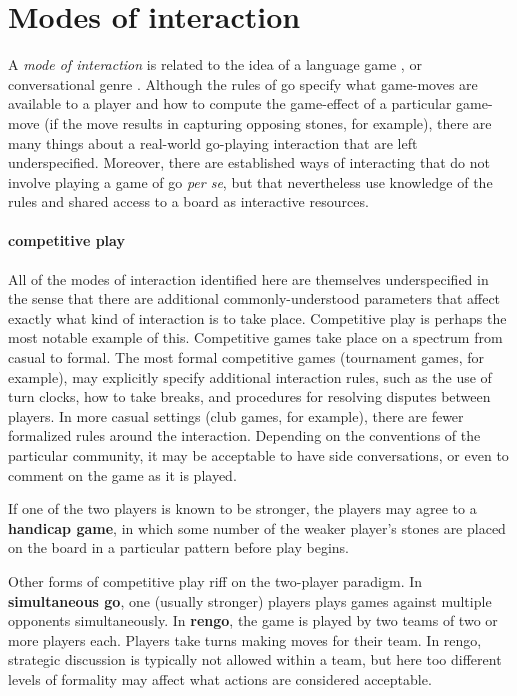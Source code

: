 \documentclass{scrartcl}
\begin{document}
\section{Modes of interaction}\label{sec:modes}

A \emph{mode of interaction} is related to the idea of a
language game \citep{wittgensteinPhilosophischeUntersuchungenPhilosophical2009}, or
conversational genre \citep{bakhtinSpeechGenresOther1987}.
Although the rules of go specify what game-moves are available to a player
and how to compute the game-effect of a particular game-move
(if the move results in capturing opposing stones, for example),
there are many things about a real-world go-playing interaction that are left
underspecified.
Moreover, there are established ways of interacting
that do not involve playing a game of go \textit{per se},
but that nevertheless 
use knowledge of the rules and shared access to a board
as interactive resources.

\paragraph{competitive play} All of the modes of interaction 
identified here are themselves underspecified in the sense that there 
are additional commonly-understood parameters that affect exactly what kind
of interaction is to take place.
Competitive play is perhaps the most notable example of this.
Competitive games take place on a spectrum from casual to formal.
The most formal competitive games (tournament games, for example),
may explicitly specify additional interaction rules,
such as the use of turn clocks, 
how to take breaks, and
procedures for resolving disputes between players.
In more casual settings (club games, for example),
there are fewer formalized rules around the interaction.
Depending on the conventions of the particular community,
it may be acceptable to have side conversations, 
or even to comment on the game as it is played.

If one of the two players is known to be stronger,
the players may agree to a \textbf{handicap game},
in which some number of the weaker player's stones are placed on the board 
in a particular pattern before play begins.

Other forms of competitive play riff on the two-player paradigm.
In \textbf{simultaneous go}, one (usually stronger) players plays
games against multiple opponents simultaneously.
In \textbf{rengo}, the game is played by two teams of two or more players each.
Players take turns making moves for their team.
In rengo, strategic discussion is typically not allowed within a team, 
but here too different levels of formality may affect what actions are 
considered acceptable.
\end{document}
